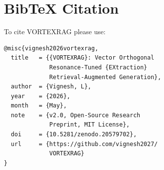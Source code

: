 \documentclass[10pt,twocolumn]{article}
\begin{document}
\section{BibTeX Citation}\label{app:bibtex}

To cite VORTEXRAG please use:

\begin{verbatim}
@misc{vignesh2026vortexrag,
  title   = {{VORTEXRAG}: Vector Orthogonal
             Resonance-Tuned {EXtraction}
             Retrieval-Augmented Generation},
  author  = {Vignesh, L},
  year    = {2026},
  month   = {May},
  note    = {v2.0, Open-Source Research
             Preprint, MIT License},
  doi     = {10.5281/zenodo.20579702},
  url     = {https://github.com/vignesh2027/
             VORTEXRAG}
}
\end{verbatim}
\end{document}
